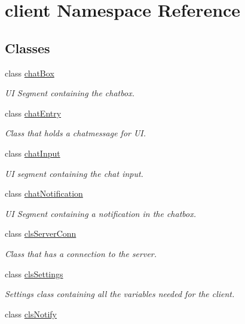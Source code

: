 \hypertarget{namespaceclient}{\section{client Namespace Reference}
\label{d7/d1c/namespaceclient}
}
\subsection*{Classes}
\begin{DoxyCompactItemize}
\item 
class \hyperlink{classclient_1_1chat_box}{chat\-Box}
\begin{DoxyCompactList}\small\item\em U\-I Segment containing the chatbox. \end{DoxyCompactList}\item 
class \hyperlink{classclient_1_1chat_entry}{chat\-Entry}
\begin{DoxyCompactList}\small\item\em Class that holds a chatmessage for U\-I. \end{DoxyCompactList}\item 
class \hyperlink{classclient_1_1chat_input}{chat\-Input}
\begin{DoxyCompactList}\small\item\em U\-I segment containing the chat input. \end{DoxyCompactList}\item 
class \hyperlink{classclient_1_1chat_notification}{chat\-Notification}
\begin{DoxyCompactList}\small\item\em U\-I Segment containing a notification in the chatbox. \end{DoxyCompactList}\item 
class \hyperlink{classclient_1_1cls_server_conn}{cls\-Server\-Conn}
\begin{DoxyCompactList}\small\item\em Class that has a connection to the server. \end{DoxyCompactList}\item 
class \hyperlink{classclient_1_1cls_settings}{cls\-Settings}
\begin{DoxyCompactList}\small\item\em Settings class containing all the variables needed for the client. \end{DoxyCompactList}\item 
class \hyperlink{classclient_1_1cls_notify}{cls\-Notify}

\end{DoxyCompactItemize}

